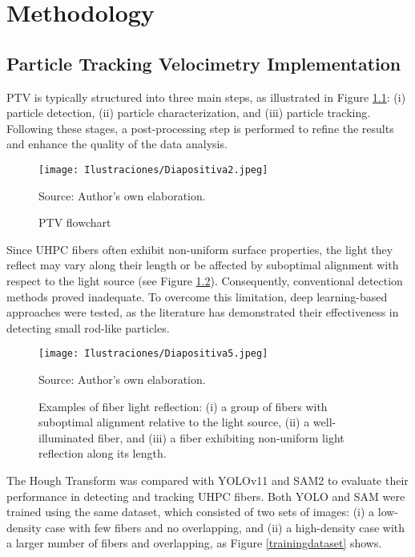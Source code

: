 
\chapter{Methodology}
\label{metodo} %

\section{Particle Tracking Velocimetry Implementation}

PTV is typically structured into three main steps, as illustrated in Figure \ref{ptvflowchar}: (i) particle detection, (ii) particle characterization, and (iii) particle tracking. Following these stages, a post-processing step is performed to refine the results and enhance the quality of the data analysis.

\begin{figure}[htb]
    \centering
    \texttt{[image: Ilustraciones/Diapositiva2.jpeg]}
    \caption{PTV flowchart}
    Source: Author's own elaboration.
    \label{ptvflowchar}
\end{figure}

Since UHPC fibers often exhibit non-uniform surface properties, the light they reflect may vary along their length or be affected by suboptimal alignment with respect to the light source (see Figure \ref{fiberlight}). Consequently, conventional detection methods proved inadequate. To overcome this limitation, deep learning-based approaches were tested, as the literature has demonstrated their effectiveness in detecting small rod-like particles.

\begin{figure}[htb]
    \centering
    \texttt{[image: Ilustraciones/Diapositiva5.jpeg]}
    \caption{Examples of fiber light reflection: (i) a group of fibers with suboptimal alignment relative to the light source, (ii) a well-illuminated fiber, and (iii) a fiber exhibiting non-uniform light reflection along its length.}
    Source: Author's own elaboration.
    \label{fiberlight}
\end{figure}

The Hough Transform was compared with YOLOv11 and SAM2 to evaluate their performance in detecting and tracking UHPC fibers. Both YOLO and SAM were trained using the same dataset, which consisted of two sets of images: (i) a low-density case with few fibers and no overlapping, and (ii) a high-density case with a larger number of fibers and overlapping, as Figure \ref{trainingdataset} shows.

